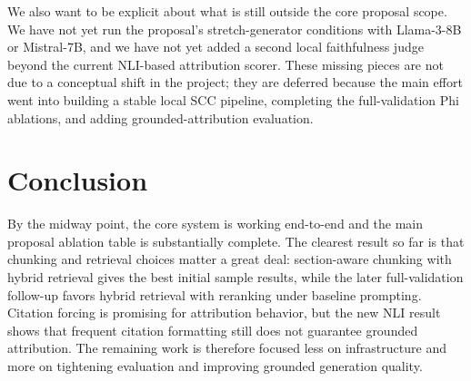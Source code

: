 \documentclass[11pt]{article}
\begin{document}
We also want to be explicit about what is still outside the core proposal scope. We have not yet run the proposal's stretch-generator conditions with Llama-3-8B or Mistral-7B, and we have not yet added a second local faithfulness judge beyond the current NLI-based attribution scorer. These missing pieces are not due to a conceptual shift in the project; they are deferred because the main effort went into building a stable local SCC pipeline, completing the full-validation Phi ablations, and adding grounded-attribution evaluation.

\section{Conclusion}

By the midway point, the core system is working end-to-end and the main proposal ablation table is substantially complete. The clearest result so far is that chunking and retrieval choices matter a great deal: section-aware chunking with hybrid retrieval gives the best initial sample results, while the later full-validation follow-up favors hybrid retrieval with reranking under baseline prompting. Citation forcing is promising for attribution behavior, but the new NLI result shows that frequent citation formatting still does not guarantee grounded attribution. The remaining work is therefore focused less on infrastructure and more on tightening evaluation and improving grounded generation quality.

{\small


}
\end{document}
